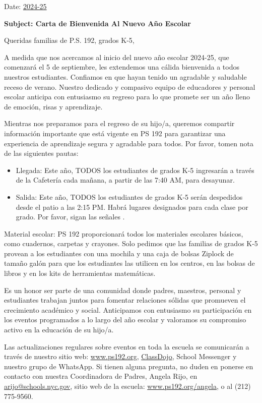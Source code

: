 \documentclass[12pt,letterpaper]{article}
\begin{document}
\vspace*{0.5in}
Date: \href{https://www.ps192.org}{2024-25} 

\textbf{Subject: Carta de Bienvenida Al Nuevo Año Escolar}

Queridas familias de P.S. 192, grados K-5,

A medida que nos acercamos al inicio del nuevo año escolar 2024-25, que comenzará el 5 de septiembre, les extendemos una cálida bienvenida a todos nuestros estudiantes. Confiamos
en que hayan tenido un agradable y saludable receso de verano. Nuestro dedicado y
compasivo equipo de educadores y personal escolar anticipa con entusiasmo su regreso para
lo que promete ser un año lleno de emoción, risas y aprendizaje.

Mientras nos preparamos para el regreso de su hijo/a, queremos compartir información
importante que está vigente en PS 192 para garantizar una experiencia de aprendizaje 
segura y agradable para todos. Por favor, tomen nota de las siguientes pautas:
	\begin{itemize}
	\item Llegada: Este año, TODOS los estudiantes de grados K-5 ingresarán a través de la
	Cafetería cada mañana, a partir de las 7:40 AM, para desayunar.
	\item Salida: Este año, TODOS los estudiantes de grados K-5 serán despedidos desde el
	patio a las 2:15 PM. Habrá lugares designados para cada clase por grado. Por favor,
	sigan las señales .
	\end{itemize}
		
Material escolar: PS 192 proporcionará todos los materiales escolares básicos, como 
cuadernos, carpetas y crayones. Solo pedimos que las familias de grados K-5 provean a los
estudiantes con una mochila y una caja de bolsas Ziplock de tamaño galón para que los 
estudiantes las utilicen en los centros, en las bolsas de libros y en los kits de herramientas matemáticas.

Es un honor ser parte de una comunidad donde padres, maestros, personal y estudiantes
trabajan juntos para fomentar relaciones sólidas que promueven el crecimiento académico y
social. Anticipamos con entusiasmo su participación en los eventos programados a lo largo
del año escolar y valoramos su compromiso activo en la educación de su hijo/a.

Las actualizaciones regulares sobre eventos en toda la escuela se comunicarán a través de
nuestro sitio web: \url{www.ps192.org}, \href{https://www.classdojo.com/}{ClassDojo}, School Messenger y nuestro grupo de WhatsApp. Si tienen alguna pregunta, no duden en ponerse en contacto con nuestra Coordinadora de Padres, Angela Rijo, en 
\href{mailto:arijo@schools.nyc.gov}{arijo@schools.nyc.gov}, sitio web de la escuela: \url{www.ps192.org/angela}, o al (212) 775-9560.
\end{document}
